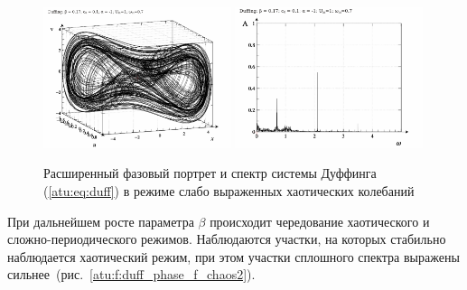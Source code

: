 \begin{figure}[ht!]
\begin{center}
  \includegraphics[width=0.49\textwidth]{p/cha/duff/duff_p_1x00_0x70_0x17.png}
  \hfill
  \includegraphics[width=0.49\textwidth]{p/cha/duff/duff_f_1x00_0x70_0x17.png}
\end{center}
  \caption{Расширенный фазовый портрет и спектр системы Дуффинга (\ref{atu:eq:duff}) в режиме слабо выраженных хаотических колебаний}
\label{atu:f:duff_phase_f_chaos1}
\end{figure}


При дальнейшем росте параметра $\beta$ происходит чередование хаотического
и сложно-периодического режимов. Наблюдаются участки,
на которых стабильно наблюдается хаотический режим,
при этом участки сплошного спектра выражены
сильнее~(рис.~\ref{atu:f:duff_phase_f_chaos2}).

